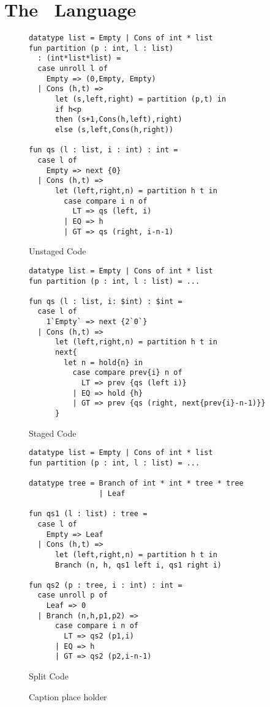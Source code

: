 \section {The \lang\ Language}

\begin{figure*}
\label{fig:quickselect}
\begin{minipage}{0.5\textwidth}
\begin{lstlisting} 
datatype list = Empty | Cons of int * list
fun partition (p : int, l : list) 
  : (int*list*list) =
  case unroll l of 
    Empty => (0,Empty, Empty) 
  | Cons (h,t) =>
      let (s,left,right) = partition (p,t) in
      if h<p 
      then (s+1,Cons(h,left),right)
      else (s,left,Cons(h,right))

fun qs (l : list, i : int) : int = 
  case l of
    Empty => next {0}
  | Cons (h,t) => 
      let (left,right,n) = partition h t in
        case compare i n of
          LT => qs (left, i)
        | EQ => h
        | GT => qs (right, i-n-1)
\end{lstlisting}
\caption{Unstaged Code}
\end{minipage}
\begin{minipage}{0.5\textwidth}
\begin{lstlisting} 
datatype list = Empty | Cons of int * list
fun partition (p : int, l : list) = ...

fun qs (l : list, i: $int) : $int = 
  case l of
    1`Empty` => next {2`0`}
  | Cons (h,t) => 
      let (left,right,n) = partition h t in
      next{
        let n = hold{n} in
          case compare prev{i} n of
            LT => prev {qs (left i)}
          | EQ => hold {h}
          | GT => prev {qs (right, next{prev{i}-n-1)}}
      }	
\end{lstlisting}
\caption{Staged Code}
\end{minipage}
\begin{minipage}{0.5\textwidth}
\begin{lstlisting} 
datatype list = Empty | Cons of int * list
fun partition (p : int, l : list) = ...
	
datatype tree = Branch of int * int * tree * tree
                | Leaf

fun qs1 (l : list) : tree =
  case l of
    Empty => Leaf
  | Cons (h,t) => 
      let (left,right,n) = partition h t in
      Branch (n, h, qs1 left i, qs1 right i)

fun qs2 (p : tree, i : int) : int = 
  case unroll p of
    Leaf => 0
  | Branch (n,h,p1,p2) => 
      case compare i n of
        LT => qs2 (p1,i)
      | EQ => h
      | GT => qs2 (p2,i-n-1)
\end{lstlisting}
\caption{Split Code}
\end{minipage}
\caption{Caption place holder}
\end{figure*}

